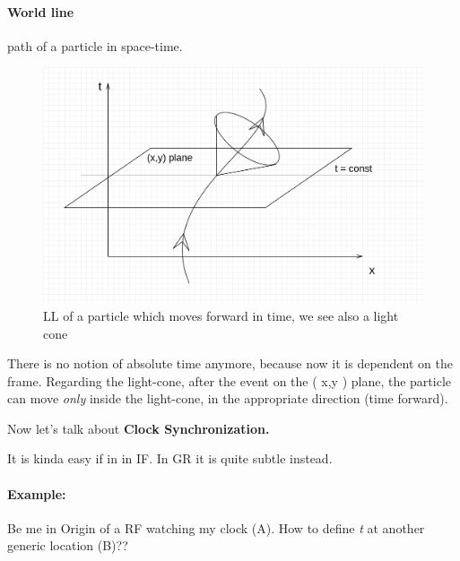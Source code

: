 \documentclass{report}
\begin{document}
\paragraph{World line} path of a particle in space-time.

\begin{figure}
\centering
\includegraphics[width=\linewidth]{imm/WLLC.png}
\caption{LL of a particle which moves forward in time, we see also a light cone}
\label{mm:WLLC}
\end{figure}

There is no notion of absolute time anymore, because now it is dependent on the frame. 
Regarding the light-cone, after the event on the ( x,y ) plane, the particle can move \emph{only} inside the light-cone, in the appropriate direction (time forward).

Now let's talk about \textbf{Clock Synchronization.} \par
It is kinda easy if in in IF. In GR it is quite subtle instead. \par

\paragraph{Example:} Be me in Origin of a RF watching my clock (A). How to define \emph{t} at another generic location (B)??
\end{document}
